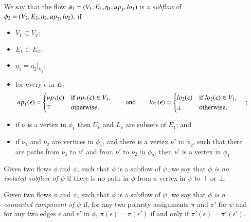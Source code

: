 \begin{definition}\label{definition:Subflow}
We say that the flow $\phi_1=(V_1,E_1,\eta_1,{\mathit up}_1,{\mathit lo}_1)$ is a \emph{subflow} of\newline $\phi_2=(V_2,E_2,\eta_2,{\mathit up}_2,{\mathit lo}_2)$, if
\begin{itemize}
\item $V_1\subset V_2$;
\item $E_1\subset E_2$;
\item $\eta_1=\eta_2|_{V_1}$;
\item for every $\epsilon$ in $E_1$
\[
{\mathit up}_1(\epsilon)=
\begin{cases}
{\mathit up}_2(\epsilon) & \mbox{if ${\mathit up}_2(\epsilon)\in V_1$,}
\\
\top & \mbox{otherwise.}
\end{cases}
\qquad\mbox{and}\qquad
{\mathit lo}_1(\epsilon)=
\begin{cases}
{\mathit lo}_2(\epsilon) & \mbox{if ${\mathit lo}_2(\epsilon)\in V_1$,}
\\
\bot & \mbox{otherwise.}
\end{cases}\quad;
\]
\item if $\nu$ is a vertex in $\phi_1$ then $U_\nu$ and $L_\nu$ are subsets of $E_1$; and
\item
if $\nu_1$ and $\nu_2$ are vertices in $\phi_1$, and there is a vertex $\nu'$ in $\phi_2$, such that there are paths from $\nu_1$ to $\nu'$ and from $\nu'$ to $\nu_2$ in $\phi_2$, then $\nu'$ is a vertex in $\phi_1$.
\end{itemize}
\end{definition}

\begin{definition}\label{defintion:IsolatedSubflow}
Given two flows $\phi$ and $\psi$, such that $\phi$ is a subflow of $\psi$, we say that \emph{$\phi$ is an isolated subflow of $\psi$} if there is no path in $\phi$ from a vertex in $\psi$ to $\top$ or $\bot$.
\end{definition}

\begin{definition}\label{definition:ConnectedComponent}
Given two flows $\phi$ and $\psi$, such that $\phi$ is a subflow of $\psi$, we say that \emph{$\phi$ is a connected component of $\psi$} if, for any two polarity assignments $\pi$ and $\pi'$ for $\psi$ and for any two edges $\epsilon$ and $\epsilon'$ in $\phi$, $\pi(\epsilon)=\pi(\epsilon')$ if and only if $\pi'(\epsilon)=\pi'(\epsilon')$.
\end{definition}
